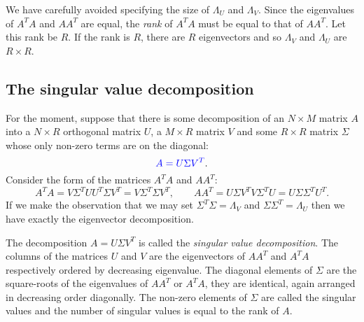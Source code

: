 \documentclass[a4paper]{article}
\newcommand{\highlight}[1]{{\color{blue}#1}}
\begin{document}
We have carefully avoided specifying the size of $\Lambda_U$ and $\Lambda_V$.
Since the eigenvalues of $A^TA$ and $AA^T$ are equal, the \emph{rank} of $A^TA$
must be equal to that of $AA^T$. Let this rank be $R$. If the rank is $R$, there
are $R$ eigenvectors and so \highlight{$\Lambda_V$ and $\Lambda_U$ are $R \times
R$}.

\subsection{The singular value decomposition}

For the moment, suppose that there is some decomposition of an $N \times M$
matrix $A$ into a $N \times R$ orthogonal matrix $U$, a $M \times R$ matrix $V$
and some $R \times R$ matrix $\Sigma$ whose only non-zero terms are on the
diagonal:
\[
  \highlight{A = U \Sigma V^T}.
\]
Consider the form of the matrices $A^TA$ and $AA^T$:
\[
  A^TA = V \Sigma^T U U^T \Sigma V^T = V \Sigma^T \Sigma V^T, \qquad
  AA^T = U \Sigma V^T V \Sigma^T U = U \Sigma \Sigma^T U^T.
\]
If we make the observation that we may set $\Sigma^T \Sigma = \Lambda_V$ and
$\Sigma \Sigma^T = \Lambda_U$ then we have exactly the eigenvector
decomposition.

The decomposition $A = U \Sigma V^T$ is called the \emph{singular value
decomposition}. \highlight{The columns of the matrices $U$ and $V$ are the
eigenvectors of $AA^T$ and $A^TA$ respectively} ordered by decreasing
eigenvalue. \highlight{The diagonal elements of $\Sigma$ are the square-roots of
the eigenvalues of $AA^T$ or $A^TA$}, they are identical, again arranged in
decreasing order diagonally. The non-zero elements of $\Sigma$ are called the
singular values and \highlight{the number of singular values is equal to the
rank of $A$}.
\end{document}

